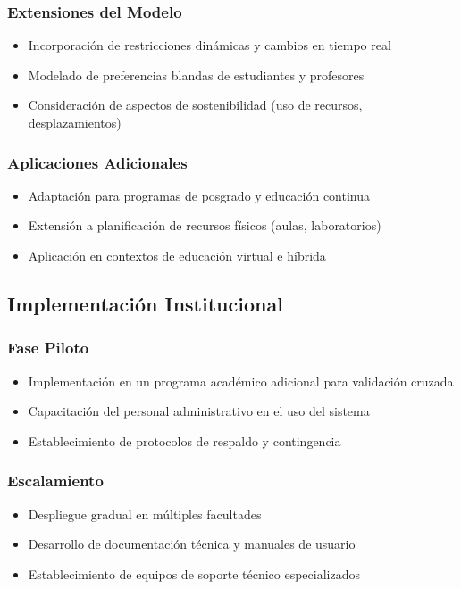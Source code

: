\subsubsection{Extensiones del Modelo}
\begin{itemize}
    \item Incorporación de restricciones dinámicas y cambios en tiempo real
    \item Modelado de preferencias blandas de estudiantes y profesores
    \item Consideración de aspectos de sostenibilidad (uso de recursos, desplazamientos)
\end{itemize}

\subsubsection{Aplicaciones Adicionales}
\begin{itemize}
    \item Adaptación para programas de posgrado y educación continua
    \item Extensión a planificación de recursos físicos (aulas, laboratorios)
    \item Aplicación en contextos de educación virtual e híbrida
\end{itemize}

\subsection{Implementación Institucional}

\subsubsection{Fase Piloto}
\begin{itemize}
    \item Implementación en un programa académico adicional para validación cruzada
    \item Capacitación del personal administrativo en el uso del sistema
    \item Establecimiento de protocolos de respaldo y contingencia
\end{itemize}

\subsubsection{Escalamiento}
\begin{itemize}
    \item Despliegue gradual en múltiples facultades
    \item Desarrollo de documentación técnica y manuales de usuario
    \item Establecimiento de equipos de soporte técnico especializados
\end{itemize}

